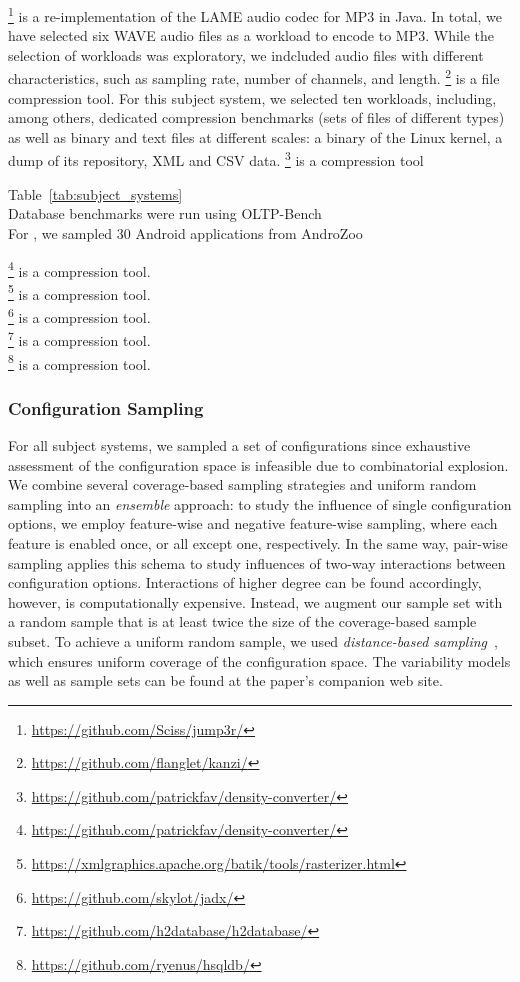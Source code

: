 \footnote{\url{https://github.com/Sciss/jump3r/}} is a re-implementation of the LAME audio codec for MP3 in Java. In total, we have selected {\color{red}six} WAVE audio files as a workload to encode to MP3. While the selection of workloads was exploratory, we indcluded audio files with different characteristics, such as sampling rate, number of channels, and length. 
\footnote{\url{https://github.com/flanglet/kanzi/}} is a file compression tool. For this subject system, we selected {\color{red}ten} workloads, including, among others, dedicated compression benchmarks (sets of files of different types) as well as binary and text files at different scales: a binary of the Linux kernel, a dump of its repository, XML and CSV data. 
\footnote{\url{https://github.com/patrickfav/density-converter/}} is a compression tool


Table~\ref{tab:subject_systems}\\
Database benchmarks were run using OLTP-Bench\cite{difallah_oltp_2013}\\
For , we sampled 30 Android applications from AndroZoo~\cite{allix_androzoo_2016}
\noindent

\footnote{\url{https://github.com/patrickfav/density-converter/}} is a compression tool.\\
\footnote{\url{https://xmlgraphics.apache.org/batik/tools/rasterizer.html}} is a compression tool.\\
\footnote{\url{https://github.com/skylot/jadx/}} is a compression tool.\\
\footnote{\url{https://github.com/h2database/h2database/}} is a compression tool.\\
\footnote{\url{https://github.com/ryenus/hsqldb/}} is a compression tool.\\

\subsubsection{Configuration Sampling}
For all subject systems, we sampled a set of configurations since exhaustive assessment of the configuration space is infeasible due to combinatorial explosion. We combine several coverage-based sampling strategies and uniform random sampling into an \emph{ensemble} approach: to study the influence of single configuration options, we employ feature-wise and negative feature-wise sampling, where each feature is enabled once, or all except one, respectively. In the same way, pair-wise sampling applies this schema to study influences of two-way interactions between configuration options. Interactions of higher degree can be found accordingly, however, is computationally expensive. Instead, we augment our sample set with a random sample that is at least twice the size of the coverage-based sample subset. To achieve a uniform random sample, we used \emph{distance-based sampling}~\cite{kaltenecker_distance-based_2019}, which ensures uniform coverage of the configuration space. The variability models as well as sample sets can be found at the paper's companion web site.

